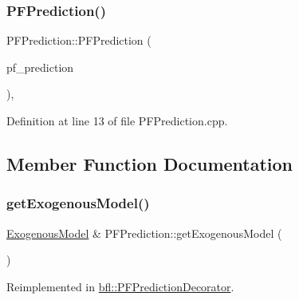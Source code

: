 \mbox{\label{classbfl_1_1PFPrediction_a3a8645cb4fe088e7a3a2dc1e64aaca35}} 
\subsubsection{\texorpdfstring{P\+F\+Prediction()}{PFPrediction()}\hspace{0.1cm}{\footnotesize\ttfamily [2/2]}}
{\footnotesize\ttfamily P\+F\+Prediction\+::\+P\+F\+Prediction (\begin{DoxyParamCaption}\item[{\mbox{\hyperlink{classbfl_1_1PFPrediction}{P\+F\+Prediction}} \&\&}]{pf\+\_\+prediction }\end{DoxyParamCaption})\hspace{0.3cm}{\ttfamily [protected]}, {\ttfamily [noexcept]}}



Definition at line 13 of file P\+F\+Prediction.\+cpp.



\subsection{Member Function Documentation}
\mbox{\label{classbfl_1_1PFPrediction_aefa127a440649447e8ac659ef65b7a2a}} 
\subsubsection{\texorpdfstring{get\+Exogenous\+Model()}{getExogenousModel()}}
{\footnotesize\ttfamily \mbox{\hyperlink{classbfl_1_1ExogenousModel}{Exogenous\+Model}} \& P\+F\+Prediction\+::get\+Exogenous\+Model (\begin{DoxyParamCaption}{ }\end{DoxyParamCaption})\hspace{0.3cm}{\ttfamily [virtual]}}



Reimplemented in \mbox{\hyperlink{classbfl_1_1PFPredictionDecorator_a8d25d3765f642f7de1af897d088d8da9}{bfl\+::\+P\+F\+Prediction\+Decorator}}.



